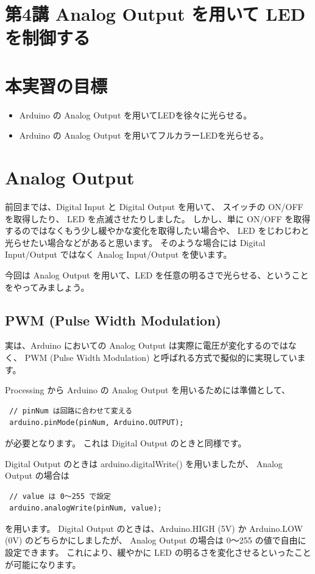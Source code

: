 \documentclass[11pt,a4paper]{jarticle}
\begin{document}
\section*{\LARGE{第4講 Analog Output を用いて LED を制御する}}
\section{本実習の目標}
\begin{itemize}
 \item Arduino の Analog Output を用いてLEDを徐々に光らせる。
 \item Arduino の Analog Output を用いてフルカラーLEDを光らせる。
\end{itemize}

\section{Analog Output}
前回までは、Digital Input と Digital Output を用いて、
スイッチの ON/OFF を取得したり、 LED を点滅させたりしました。
しかし、単に ON/OFF を取得するのではなくもう少し緩やかな変化を取得したい場合や、
LED をじわじわと光らせたい場合などがあると思います。
そのような場合には Digital Input/Output ではなく Analog Input/Output を使います。

今回は Analog Output を用いて、LED を任意の明るさで光らせる、ということをやってみましょう。

\subsection*{PWM (Pulse Width Modulation)}
実は、Arduino においての Analog Output は実際に電圧が変化するのではなく、
PWM (Pulse Width Modulation) と呼ばれる方式で擬似的に実現しています。

Processing から Arduino の Analog Output を用いるためには準備として、
\begin{lstlisting}
 // pinNum は回路に合わせて変える 
 arduino.pinMode(pinNum, Arduino.OUTPUT);
\end{lstlisting}
が必要となります。
これは Digital Output のときと同様です。

Digital Output のときは arduino.digitalWrite() を用いましたが、
Analog Output の場合は
\begin{lstlisting}
 // value は 0〜255 で設定
 arduino.analogWrite(pinNum, value);
\end{lstlisting}
を用います。
Digital Output のときは、Arduino.HIGH (5V) か Arduino.LOW (0V) のどちらかにしましたが、
Analog Output の場合は 0〜255 の値で自由に設定できます。
これにより、緩やかに LED の明るさを変化させるといったことが可能になります。
\end{document}
